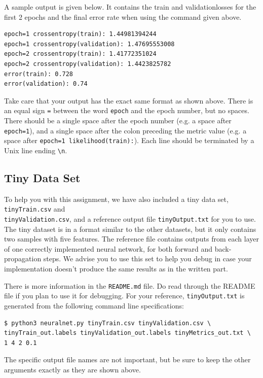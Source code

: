 \documentclass[11pt,addpoints,answers]{exam}
\begin{document}
A sample output is given below. It contains the train and validation\thinspace losses for the first 2 epochs and the final error rate when using the command given above.

\begin{lstlisting}
epoch=1 crossentropy(train): 1.44981394244
epoch=1 crossentropy(validation): 1.47695553008
epoch=2 crossentropy(train): 1.41772351024
epoch=2 crossentropy(validation): 1.4423825782
error(train): 0.728
error(validation): 0.74
\end{lstlisting}

Take care that your output has the exact same format as shown above. There is an equal sign \lstinline{=} between the word \lstinline{epoch} and the epoch number, but no spaces. There should be a single space after the epoch number (e.g. a space after \lstinline{epoch=1}), and a single space after the colon preceding the metric value (e.g. a space after \lstinline{epoch=1 likelihood(train):}). Each line should be terminated by a Unix line ending \lstinline{\n}.

\subsection{Tiny Data Set} \label{tiny}
To help you with this assignment, we have also included a tiny data set, \texttt{tinyTrain.csv} and\\ \texttt{tinyValidation.csv}, and a reference output file \texttt{tinyOutput.txt} for you to use. The tiny dataset is in a format similar to the other datasets, but it only contains two samples with five features. The reference file contains outputs from each layer of one correctly implemented neural network, for both forward and back-propagation steps. We advise you to use this set to help you debug in case your implementation doesn't produce the same results as in the written part.

There is more information in the \texttt{README.md} file. Do read through the README file if you plan to use it for debugging. For your reference, \texttt{tinyOutput.txt} is generated from the following command line specifications:

\begin{lstlisting}[language=Shell]
$ python3 neuralnet.py tinyTrain.csv tinyValidation.csv \
tinyTrain_out.labels tinyValidation_out.labels tinyMetrics_out.txt \
1 4 2 0.1
\end{lstlisting}
The specific output file names are not important, but be sure to keep the other arguments exactly as they are shown above.
\end{document}
